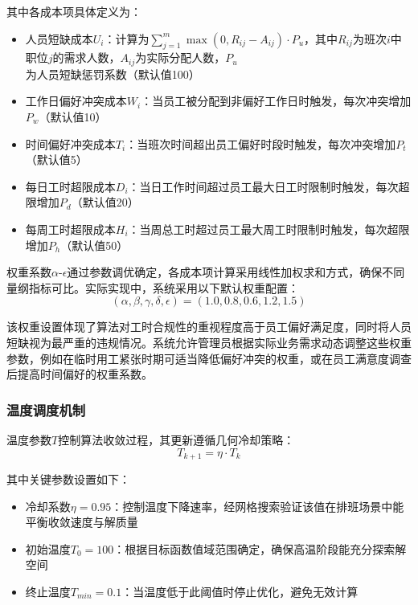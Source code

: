 \documentclass{ctexart}
\begin{document}
其中各成本项具体定义为：
\begin{itemize}
    \item 人员短缺成本$U_i$：计算为$\sum_{j=1}^{m} \max(0, R_{ij} - A_{ij}) \cdot P_u$，其中$R_{ij}$为班次$i$中职位$j$的需求人数，$A_{ij}$为实际分配人数，$P_u$为人员短缺惩罚系数（默认值100）
    
    \item 工作日偏好冲突成本$W_i$：当员工被分配到非偏好工作日时触发，每次冲突增加$P_w$（默认值10）
    
    \item 时间偏好冲突成本$T_i$：当班次时间超出员工偏好时段时触发，每次冲突增加$P_t$（默认值5）
    
    \item 每日工时超限成本$D_i$：当日工作时间超过员工最大日工时限制时触发，每次超限增加$P_d$（默认值20）
    
    \item 每周工时超限成本$H_i$：当周总工时超过员工最大周工时限制时触发，每次超限增加$P_h$（默认值50）
\end{itemize}

权重系数$\alpha$-$\epsilon$通过参数调优确定，各成本项计算采用线性加权求和方式，确保不同量纲指标可比。实际实现中，系统采用以下默认权重配置：
\begin{equation}
(\alpha, \beta, \gamma, \delta, \epsilon) = (1.0, 0.8, 0.6, 1.2, 1.5)
\end{equation}

该权重设置体现了算法对工时合规性的重视程度高于员工偏好满足度，同时将人员短缺视为最严重的违规情况。系统允许管理员根据实际业务需求动态调整这些权重参数，例如在临时用工紧张时期可适当降低偏好冲突的权重，或在员工满意度调查后提高时间偏好的权重系数。

\subsubsection{温度调度机制}
温度参数$T$控制算法收敛过程，其更新遵循几何冷却策略：
\begin{equation}
T_{k+1} = \eta \cdot T_k
\end{equation}

其中关键参数设置如下：
\begin{itemize}
    \item 冷却系数$\eta=0.95$：控制温度下降速率，经网格搜索验证该值在排班场景中能平衡收敛速度与解质量
    \item 初始温度$T_0=100$：根据目标函数值域范围确定，确保高温阶段能充分探索解空间
    \item 终止温度$T_{min}=0.1$：当温度低于此阈值时停止优化，避免无效计算
\end{itemize}
\end{document}
